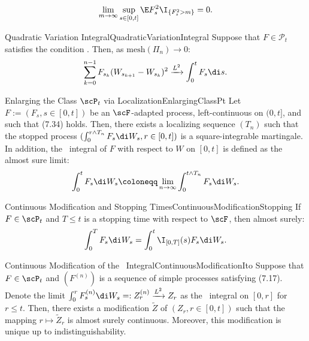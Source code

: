 \begin{equation}\label{eq:UniformIntegrabilityCondition}
	\lim_{m \to \infty} \sup_{s \in [0, t]} \E F_s^2 \I_{\{F_s^2 > m\}} = 0.
\end{equation}

\begin{lem}{Quadratic Variation Integral}{QuadraticVariationIntegral}
	Suppose that $F \in \mathcal{P}_t$ satisfies the condition . Then, as $\mathrm{mesh}(\Pi_n) \to 0$:
	\begin{equation}\label{eq:QuadraticVariationLimit}
		\sum_{k=0}^{n-1} F_{s_k} (W_{s_{k+1}} - W_{s_k})^2 \xrightarrow{L^2} \int_0^t F_s \di s.
	\end{equation}
\end{lem}

\begin{thm}{Enlarging the Class $\scP_t$ via Localization}{EnlargingClassPt}
	Let $F := (F_s, s \in [0, t])$ be an $\scF$-adapted process, left-continuous on $(0, t]$, and such that (7.34) holds. Then, there exists a localizing sequence $(T_n)$ such that the stopped process $(\int_0^{r \wedge T_n} F_s \di W_s, r \in [0, t])$ is a square-integrable martingale. In addition, the \Ito\ integral of $F$ with respect to $W$ on $[0, t]$ is defined as the almost sure limit:
	\begin{equation}
		\int_0^t F_s \di W_s \coloneqq \lim_{n \to \infty} \int_0^{t \wedge T_n} F_s \di W_s.
		\label{eq:LocalizedIntegralLimit}
	\end{equation}
\end{thm}

\begin{prop}{Continuous Modification and Stopping Times}{ContinuousModificationStopping}
	If $F \in \scP_t$ and $T \le t$ is a stopping time with respect to $\scF$, then almost surely:
	\begin{equation}
		\int_0^T F_s \di W_s = \int_0^t \I_{[0, T]}(s) F_s \di W_s.
		\label{eq:StoppedIntegralIdentity}
	\end{equation}
\end{prop}

\begin{thm}{Continuous Modification of the \Ito\ Integral}{ContinuousModificationIto}
	Suppose that $F \in \scP_t$ and $(F^{(n)})$ is a sequence of simple processes satisfying (7.17). Denote the limit $\int_0^r F_s^{(n)} \di W_s =: Z_r^{(n)} \xrightarrow{L^2} Z_r$ as the \Ito\ integral on $[0, r]$ for $r \le t$. Then, there exists a modification $\widetilde{Z}$ of $(Z_r, r \in [0, t])$ such that the mapping $r \mapsto \widetilde{Z}_r$ is almost surely continuous. Moreover, this modification is unique up to indistinguishability.
\end{thm}

